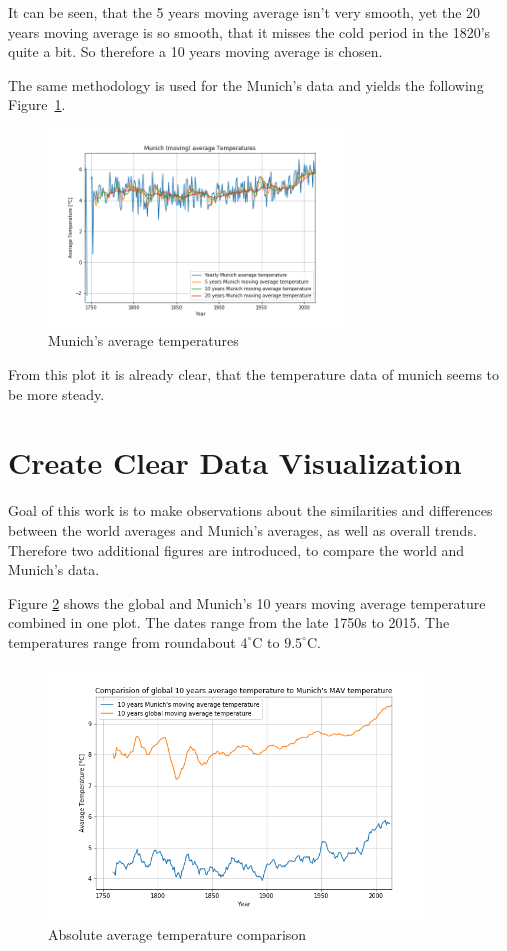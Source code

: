 \documentclass[DIV=11, a4paper, parskip=true]{scrartcl}
\begin{document}
It can be seen, that the 5 years moving average isn't very smooth, yet the 20 years moving
average is so smooth, that it misses the cold period in the 1820's quite a bit. So therefore a
10 years moving average is chosen.

The same methodology is used for the Munich's data and yields the following
Figure~\ref{munich_averages}.

\begin{figure}[H]
    \centering
    \includegraphics[width=0.7\textwidth]{munich_average_temperatures.png}
    \caption{Munich's average temperatures}
    \label{munich_averages}
\end{figure}

From this plot it is already clear, that the temperature data of munich seems to be more
steady.

\pagebreak
\section{Create Clear Data Visualization}

Goal of this work is to make observations about the similarities and differences between the
world averages and Munich's averages, as well as overall trends. Therefore two additional
figures are introduced, to compare the world and Munich's data.

Figure \ref{comparison} shows the global and Munich's 10 years moving average temperature
combined in one plot. The dates range from the late 1750s to 2015. The temperatures range from
roundabout $4^\circ$C to $9.5^\circ$C.

\begin{figure}[H]
    \centering
    \includegraphics[width=0.9\textwidth]{comparison_average_temperatures.png}
    \caption{Absolute average temperature comparison}
    \label{comparison}
\end{figure}
\end{document}
